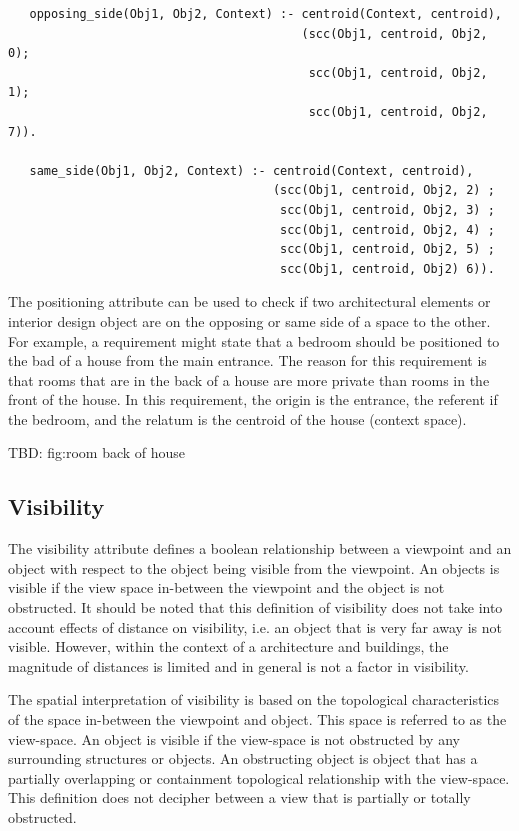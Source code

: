 \documentclass[12pt]{ucthesis}
\begin{document}
\begin{verbatim}
   opposing_side(Obj1, Obj2, Context) :- centroid(Context, centroid),
                                         (scc(Obj1, centroid, Obj2, 0);
                                          scc(Obj1, centroid, Obj2, 1);
                                          scc(Obj1, centroid, Obj2, 7)).
                                          
   same_side(Obj1, Obj2, Context) :- centroid(Context, centroid),
                                     (scc(Obj1, centroid, Obj2, 2) ;
                                      scc(Obj1, centroid, Obj2, 3) ;
                                      scc(Obj1, centroid, Obj2, 4) ;
                                      scc(Obj1, centroid, Obj2, 5) ;
                                      scc(Obj1, centroid, Obj2) 6)).   

\end{verbatim}

The positioning attribute can be used to check if two architectural elements or interior design object are on the opposing or same side of a space to the other. For example, a requirement might state that a bedroom should be positioned to the bad of a house from the main entrance. The reason for this requirement is that rooms that are in the back of a house are more private than rooms in the front of the house. In this requirement, the origin is the entrance, the referent if the bedroom, and the relatum is the centroid of the house (context space).

TBD: fig:room back of house

\subsection{Visibility}
The visibility attribute defines a boolean relationship between a viewpoint and an object with respect to the object being visible from the viewpoint. An objects is visible if the view space in-between the viewpoint and the object is not obstructed. It should be noted that this definition of visibility does not take into account effects of distance on visibility, i.e. an object that is very far away is not visible. However, within the context of a architecture and buildings, the magnitude of distances is limited and in general is not a factor in visibility.

The spatial interpretation of visibility is based on the topological characteristics of the space in-between the viewpoint and object. This space is referred to as the view-space. An object is visible if the view-space is not obstructed by any surrounding structures or objects. An obstructing object is object that has a 
partially overlapping or containment topological relationship with the view-space. This definition does not decipher between a view that is partially or totally obstructed.
\end{document}
